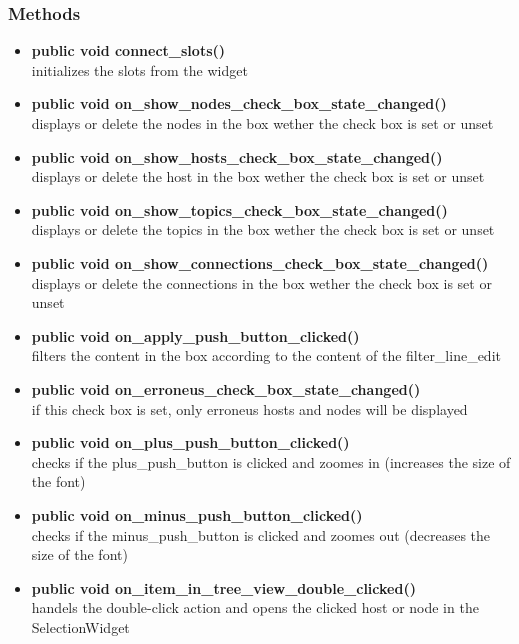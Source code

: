 \subsubsection{Methods}
\begin{itemize}
  \item \textbf{public void connect\_slots()}\\
  initializes the slots from the widget
  \item \textbf{public void on\_show\_nodes\_check\_box\_state\_changed()}\\
  displays or delete the nodes in the box wether the check box is set or unset
  \item \textbf{public void on\_show\_hosts\_check\_box\_state\_changed()}\\
  displays or delete the host in the box wether the check box is set or unset
  \item \textbf{public void on\_show\_topics\_check\_box\_state\_changed()}\\
  displays or delete the topics in the box wether the check box is set or unset
  \item \textbf{public void
  on\_show\_connections\_check\_box\_state\_changed()}\\
  displays or delete the connections in the box wether the check box is set or
  unset
  \item \textbf{public void on\_apply\_push\_button\_clicked()}\\
  filters the content in the box according to the content of the
  filter\_line\_edit
  \item \textbf{public void on\_erroneus\_check\_box\_state\_changed()}\\
  if this check box is set, only erroneus hosts and nodes will be displayed  
  \item \textbf{public void on\_plus\_push\_button\_clicked()}\\
  checks if the plus\_push\_button is clicked and zoomes in (increases the size
  of the font)
  \item \textbf{public void on\_minus\_push\_button\_clicked()}\\
  checks if the minus\_push\_button is clicked and zoomes out (decreases the
  size of the font)
  \item \textbf{public void on\_item\_in\_tree\_view\_double\_clicked()}\\
  handels the double-click action and opens the clicked host or node in the
  SelectionWidget
\end{itemize}

